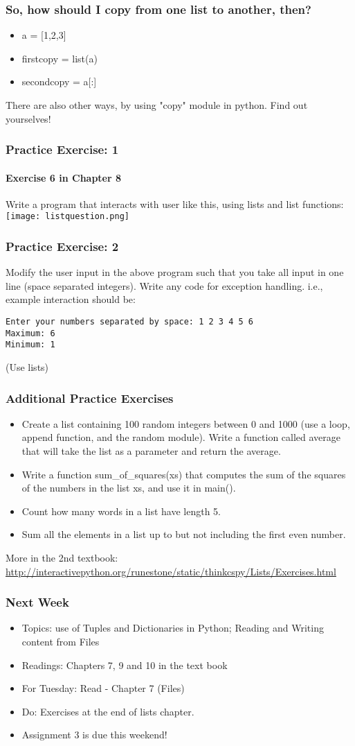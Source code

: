 \documentclass{beamer}
\begin{document}
\begin{frame}
\frametitle{So, how should I copy from one list to another, then?}
\begin{itemize}
\item a = [1,2,3]
\item firstcopy = list(a)
\item secondcopy = a[:]
\end{itemize}
There are also other ways, by using "copy" module in python. Find out yourselves!
\end{frame}

\begin{frame}
\frametitle{Practice Exercise: 1}
\framesubtitle{Exercise 6 in Chapter 8}
Write a program that interacts with user like this, using lists and list functions:
\texttt{[image: listquestion.png]}
\end{frame}

\begin{frame}[fragile]
\frametitle{Practice Exercise: 2}
Modify the user input in the above program such that you take all input in one line (space separated integers). Write any code for exception handling. i.e., example interaction should be:
\begin{verbatim}
Enter your numbers separated by space: 1 2 3 4 5 6
Maximum: 6
Minimum: 1
\end{verbatim}
(Use lists)
\end{frame}

\begin{frame}
\frametitle{Additional Practice Exercises}
\begin{itemize}
\item Create a list containing 100 random integers between 0 and 1000 (use a loop, append function, and the random module). Write a function called average that will take the list as a parameter and return the average.
\item Write a function sum\_of\_squares(xs) that computes the sum of the squares of the numbers in the list xs, and use it in main().
\item Count how many words in a list have length 5.
\item Sum all the elements in a list up to but not including the first even number.
\end{itemize}
More in the 2nd textbook: \url{http://interactivepython.org/runestone/static/thinkcspy/Lists/Exercises.html}
\end{frame}


\begin{frame}
\frametitle{Next Week}
\begin{itemize}
\item Topics: use of Tuples and Dictionaries in Python; Reading and Writing content from Files
\item Readings: Chapters 7, 9 and 10 in the text book
\item For Tuesday: Read - Chapter 7 (Files)
\item Do: Exercises at the end of lists chapter.
\item Assignment 3 is due this weekend!
\end{itemize}
\end{frame}
\end{document}
